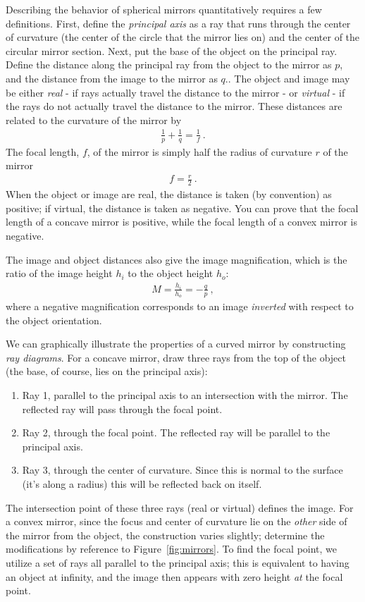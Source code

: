 \documentclass[12pt]{article}
\begin{document}
Describing the behavior of spherical mirrors quantitatively requires a
few definitions.  First, define the \textit{principal axis} as a ray
that runs through the center of curvature (the center of the circle
that the mirror lies on) and the center of the circular mirror
section.  Next, put the base of the object on the principal ray.
Define the distance along the principal ray from the object to the
mirror as $p$, and the distance from the image to the mirror as $q$..
The object and image may be either \textit{real} - if rays actually
travel the distance to the mirror - or \textit{virtual} - if the rays
do not actually travel the distance to the mirror.  These distances
are related to the curvature of the mirror by
\begin{gather*}
  \frac{1}{p} + \frac{1}{q} = \frac{1}{f}\ .
\end{gather*}
The focal length, $f$, of the mirror is simply half the radius of
curvature $r$ of the mirror
\begin{gather*}
  f = \frac{r}{2}\ .
\end{gather*}
When the object or image are real, the distance is taken (by
convention) as positive; if virtual, the distance is taken as
negative.  You can prove that the focal length of a concave mirror is
positive, while the focal length of a convex mirror is negative.

The image and object distances also give the image magnification,
which is the ratio of the image height $h_i$ to the object height
$h_o$:
\begin{gather*}
  M  = \frac{h_i}{h_o} = -\frac{q}{p}\ ,
\end{gather*}
where a negative magnification corresponds to an image
\textit{inverted} with respect to the object orientation.

We can graphically illustrate the properties of a curved mirror by
constructing \textit{ray diagrams}.  For a concave mirror, draw three
rays from the top of the object (the base, of course, lies on the
principal axis):
\begin{enumerate}
\item Ray 1, parallel to the principal axis to an intersection with
  the mirror.  The reflected ray will pass through the focal point.
\item Ray 2, through the focal point.  The reflected ray will be
  parallel to the principal axis.
\item Ray 3, through the center of curvature.  Since this is normal to
  the surface (it's along a radius) this will be reflected back on
  itself.
\end{enumerate}
The intersection point of these three rays (real or virtual) defines
the image.  For a convex mirror, since the focus and center of
curvature lie on the \textit{other} side of the mirror from the
object, the construction varies slightly; determine the modifications
by reference to Figure~\ref{fig:mirrors}.  To find the focal point, we
utilize a set of rays all parallel to the principal axis; this is
equivalent to having an object at infinity, and the image then appears
with zero height \textit{at} the focal point.
\end{document}
